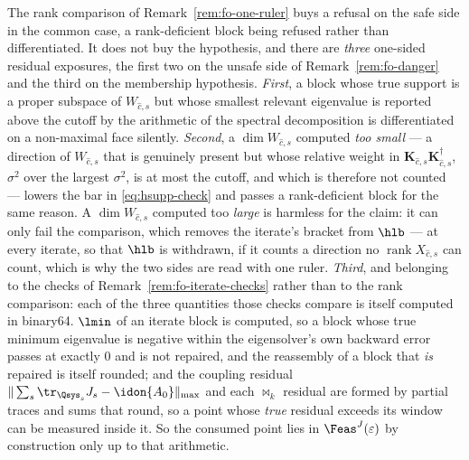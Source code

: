 
\begin{remark}\label{rem:fo-check-exposures}
The rank comparison of Remark~\ref{rem:fo-one-ruler} buys a refusal on the
safe side in the common case, a rank-deficient block being refused rather
than differentiated. It does not buy the hypothesis, and there are
\emph{three} one-sided residual exposures, the first two on the unsafe side
of Remark~\ref{rem:fo-danger} and the third on the membership hypothesis.
\emph{First}, a block whose true support is a proper subspace of
$W_{\hat c,s}$ but whose smallest relevant eigenvalue is reported above the
cutoff by the arithmetic of the spectral decomposition is differentiated on
a non-maximal face silently. \emph{Second}, a $\dim W_{\hat c,s}$ computed
\emph{too small} --- a direction of $W_{\hat c,s}$ that is genuinely present
but whose relative weight in
$\mathbf K_{\hat c,s}\mathbf K_{\hat c,s}^{\dagger}$, $\sigma^2$ over the
largest $\sigma^2$, is at most the cutoff, and which is therefore not
counted --- lowers the bar in \eqref{eq:hsupp-check} and passes a
rank-deficient block for the same reason. A $\dim W_{\hat c,s}$ computed too
\emph{large} is harmless for the claim: it can only fail the comparison,
which removes the iterate's bracket from $\hlb$ --- at every iterate, so
that $\hlb$ is withdrawn, if it counts a direction no
$\operatorname{rank}X_{\hat c,s}$ can count, which is why the two sides are
read with one ruler. \emph{Third}, and belonging to the checks of
Remark~\ref{rem:fo-iterate-checks} rather than to the rank comparison: each
of the three quantities those checks compare is itself computed in binary64.
$\lmin$ of an iterate block is computed, so a block whose true minimum
eigenvalue is negative within the eigensolver's own backward error passes at
exactly $0$ and is not repaired, and the reassembly of a block that
\emph{is} repaired is itself rounded; and the coupling residual
$\|\sum_s\tr_{\Qsys_s}J_s-\idon{A_0}\|_{\max}$ and each $\bowtie_k$ residual
are formed by partial traces and sums that round, so a point whose
\emph{true} residual exceeds its window can be measured inside it. So the
consumed point lies in $\Feas^{J}(\varepsilon)$ by construction only up to
that arithmetic.


\end{remark}
